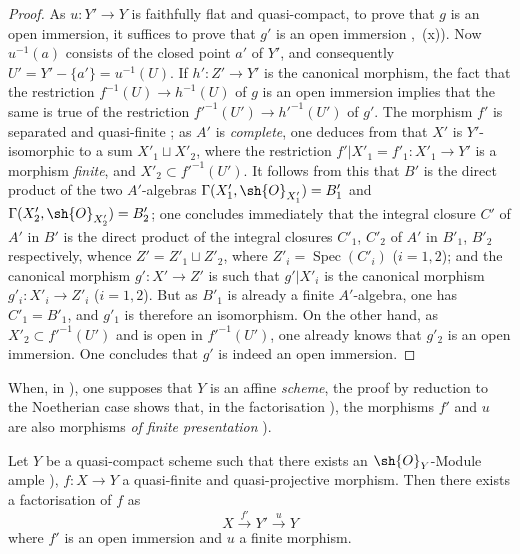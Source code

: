 \begin{proof}
As $u:Y'\to Y$ is faithfully flat and quasi-compact, to prove that $g$ is an open immersion, it suffices to prove that $g'$ is an open immersion ,~(x)).
Now $u^{-1}(a)$ consists of the closed point $a'$ of $Y'$, and consequently $U'=Y'-\{a'\}=u^{-1}(U)$.
If $h':Z'\to Y'$ is the canonical morphism, the fact that the restriction $f^{-1}(U)\to h^{-1}(U)$ of $g$ is an open immersion implies that the same is true of the restriction $f'^{-1}(U')\to h'^{-1}(U')$ of $g'$.
The morphism $f'$ is separated and quasi-finite ; as $A'$ is \emph{complete}, one deduces from  that $X'$ is $Y'$-isomorphic to a sum $X'_1\sqcup X'_2$, where the restriction $f'|X'_1=f'_1:X'_1\to Y'$ is a morphism \emph{finite}, and $X'_2\subset f'^{-1}(U')$.
It follows from this that $B'$ is the direct product of the two $A'$-algebras $\Gamma(X'_1,\sh{O}_{X'_1})=B'_1$ and $\Gamma(X'_2,\sh{O}_{X'_2})=B'_2$; one concludes immediately that the integral closure $C'$ of $A'$ in $B'$ is the direct product of the integral closures $C'_1$, $C'_2$ of $A'$ in $B'_1$, $B'_2$ respectively, whence $Z'=Z'_1\sqcup Z'_2$, where $Z'_i=\operatorname{Spec}(C'_i)$ ($i=1,2$); and the canonical morphism $g':X'\to Z'$ is such that $g'|X'_i$ is the canonical morphism $g'_i:X'_i\to Z'_i$ ($i=1,2$).
But as $B'_1$ is already a finite $A'$-algebra, one has $C'_1=B'_1$, and $g'_1$ is therefore an isomorphism.
On the other hand, as $X'_2\subset f'^{-1}(U')$ and is open in $f'^{-1}(U')$, one
already knows that $g'_2$ is an open immersion.
One concludes that $g'$ is indeed an open immersion.
\end{proof}

\begin{remark}[8.12.7]
\label{IV.8.12.7}
When, in ), one supposes that $Y$ is an affine \emph{scheme}, the proof by reduction to the Noetherian case shows that, in the factorisation ), the morphisms $f'$ and $u$ are also morphisms \emph{of finite presentation} ).
\end{remark}

\begin{corollary}[8.12.8]
\label{IV.8.12.8}
Let $Y$ be a quasi-compact scheme such that there exists an $\sh{O}_Y$-Module ample ), $f:X\to Y$ a quasi-finite and quasi-projective morphism.
Then there exists a factorisation of $f$ as
\[
X\xrightarrow{f'}Y'\xrightarrow{u}Y
\]
where $f'$ is an open immersion and $u$ a finite morphism.
\end{corollary}

